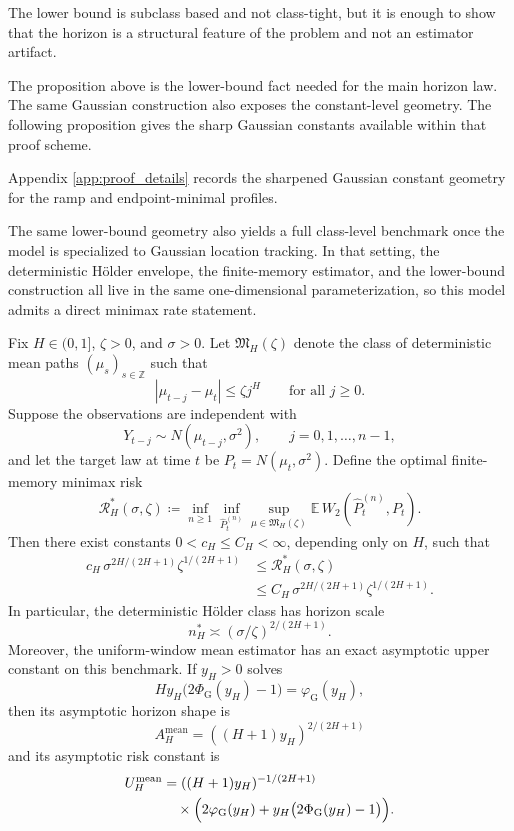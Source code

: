 The lower bound is subclass based and not class-tight, but it is enough to show
that the horizon is a structural feature of the problem and not an estimator
artifact.

The proposition above is the lower-bound fact needed for the main horizon law.
The same Gaussian construction also exposes the constant-level geometry.
The following proposition gives the sharp Gaussian constants available within
that proof scheme.

Appendix \cref{app:proof_details} records the sharpened Gaussian constant
geometry for the ramp and endpoint-minimal profiles.

The same lower-bound geometry also yields a full class-level benchmark once
the model is specialized to Gaussian location tracking. In that setting, the
deterministic H\"older envelope, the finite-memory estimator, and the lower-bound
construction all live in the same one-dimensional parameterization, so this
model admits a direct minimax rate statement.

\begin{theorem}
\label{thm:gaussian_location_minimax_holder}
Fix $H\in(0,1]$, $\zeta>0$, and $\sigma>0$. Let $\mathfrak M_H(\zeta)$ denote the
class of deterministic mean paths $(\mu_s)_{s\in\mathbb Z}$ such that
\[
  |\mu_{t-j}-\mu_t|\le \zeta j^H
  \qquad\text{for all }j\ge 0.
\]
Suppose the observations are independent with
\[
  Y_{t-j}\sim N(\mu_{t-j},\sigma^2),
  \qquad j=0,1,\dots,n-1,
\]
and let the target law at time $t$ be $P_t=N(\mu_t,\sigma^2)$. Define the
optimal finite-memory minimax risk
\[
  \mathcal R_H^*(\sigma,\zeta)
  \coloneqq
  \inf_{n\ge 1}
  \inf_{\widehat P_t^{(n)}}
  \sup_{\mu\in\mathfrak M_H(\zeta)}
  \mathbb E\,W_2\!\left(\widehat P_t^{(n)},P_t\right).
\]
Then there exist constants $0<c_H\le C_H<\infty$, depending only on $H$, such
that
\[
  \begin{aligned}
  c_H\,\sigma^{2H/(2H+1)}\zeta^{1/(2H+1)}
  &\le \mathcal R_H^*(\sigma,\zeta) \\
  &\le C_H\,\sigma^{2H/(2H+1)}\zeta^{1/(2H+1)}.
  \end{aligned}
\]
In particular, the deterministic H\"older class has horizon scale
\[
  n_H^*\asymp (\sigma/\zeta)^{2/(2H+1)}.
\]
Moreover, the uniform-window mean estimator has an exact asymptotic upper
constant on this benchmark. If $y_H>0$ solves
\[
  H y_H\bigl(2\Phi_{\mathrm G}(y_H)-1\bigr)=\varphi_{\mathrm G}(y_H),
\]
then its asymptotic horizon shape is
\[
  A_H^{\mathrm{mean}}=((H+1)y_H)^{2/(2H+1)}
\]
and its asymptotic risk constant is
\[
  \begin{aligned}
  U_H^{\mathrm{mean}}
  &= ((H+1)y_H)^{-1/(2H+1)} \\
  &\quad \times \Bigl(2\varphi_{\mathrm G}(y_H)+y_H\bigl(2\Phi_{\mathrm G}(y_H)-1\bigr)\Bigr).
  \end{aligned}
\]
\end{theorem}

